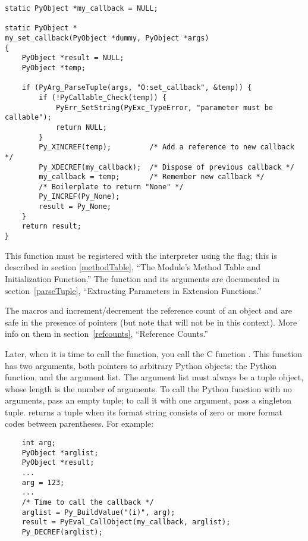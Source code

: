 \begin{verbatim}
static PyObject *my_callback = NULL;

static PyObject *
my_set_callback(PyObject *dummy, PyObject *args)
{
    PyObject *result = NULL;
    PyObject *temp;

    if (PyArg_ParseTuple(args, "O:set_callback", &temp)) {
        if (!PyCallable_Check(temp)) {
            PyErr_SetString(PyExc_TypeError, "parameter must be callable");
            return NULL;
        }
        Py_XINCREF(temp);         /* Add a reference to new callback */
        Py_XDECREF(my_callback);  /* Dispose of previous callback */
        my_callback = temp;       /* Remember new callback */
        /* Boilerplate to return "None" */
        Py_INCREF(Py_None);
        result = Py_None;
    }
    return result;
}
\end{verbatim}

This function must be registered with the interpreter using the
 flag; this is described in section
\ref{methodTable}, ``The Module's Method Table and Initialization
Function.''  The  function and its
arguments are documented in section~\ref{parseTuple}, ``Extracting
Parameters in Extension Functions.''

The macros  and 
increment/decrement the reference count of an object and are safe in
the presence of \NULL{} pointers (but note that  will not be 
\NULL{} in this context).  More info on them in
section~\ref{refcounts}, ``Reference Counts.''

Later, when it is time to call the function, you call the C function
.  This
function has two arguments, both pointers to arbitrary Python objects:
the Python function, and the argument list.  The argument list must
always be a tuple object, whose length is the number of arguments.  To
call the Python function with no arguments, pass an empty tuple; to
call it with one argument, pass a singleton tuple.
 returns a tuple when its format string
consists of zero or more format codes between parentheses.  For
example:

\begin{verbatim}
    int arg;
    PyObject *arglist;
    PyObject *result;
    ...
    arg = 123;
    ...
    /* Time to call the callback */
    arglist = Py_BuildValue("(i)", arg);
    result = PyEval_CallObject(my_callback, arglist);
    Py_DECREF(arglist);
\end{verbatim}

